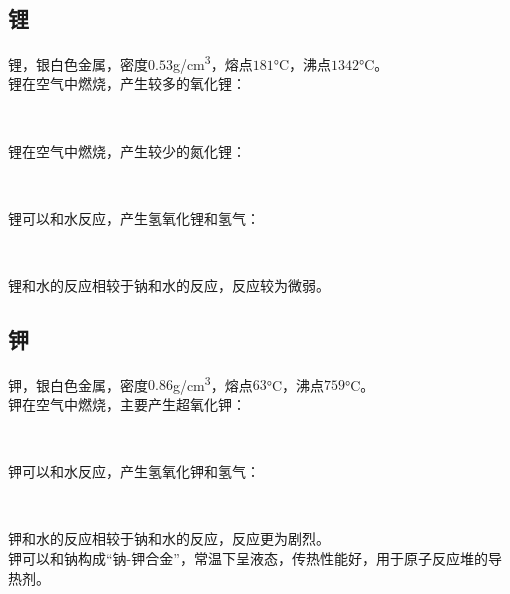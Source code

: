 \documentclass[UTF8]{ctexart}
\begin{document}
\newpage

\subsection{锂}
    锂，银白色金属，密度$0.53$\si{g/cm^3}，熔点$181$\si{\degreeCelsius}，沸点$1342$\si{\degreeCelsius}。\\[3mm]
    锂在空气中燃烧，产生较多的氧化锂：
    \begin{center}
        \\[6mm]
    \end{center}
    锂在空气中燃烧，产生较少的氮化锂：
    \begin{center}
        \\[6mm]
    \end{center}
    锂可以和水反应，产生氢氧化锂和氢气：
    \begin{center}
        \\[6mm]
    \end{center}
    锂和水的反应相较于钠和水的反应，反应较为微弱。

\subsection{钾}
    钾，银白色金属，密度$0.86$\si{g/cm^3}，熔点$63$\si{\degreeCelsius}，沸点$759$\si{\degreeCelsius}。\\[3mm]
    钾在空气中燃烧，主要产生超氧化钾：
    \begin{center}
        \\[6mm]
    \end{center}
    钾可以和水反应，产生氢氧化钾和氢气：
    \begin{center}
        \\[6mm]
    \end{center}
    钾和水的反应相较于钠和水的反应，反应更为剧烈。\\[3mm]
    钾可以和钠构成“钠-钾合金”，常温下呈液态，传热性能好，用于原子反应堆的导热剂。
\end{document}
